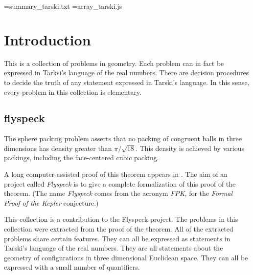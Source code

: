 






\newwrite\mywrite
\immediate\openout\mywrite=summary_tarski.txt
\newwrite\myhtml
\immediate\openout\myhtml=array_tarski.js

\def\filetarskiaway{
\immediate\write\mywrite{}\closeout\mywrite 
\immediate\write\myhtml{//fin}\closeout\myhtml
}


\section{Introduction}
\label{tarski:XX}


This is a collection of problems
in geometry.  Each problem can in fact be expressed in 
Tarksi's language of the real numbers.  There are decision
procedures to decide 
the truth of
any statement expressed in Tarski's language.  In this
sense, every problem in this collection is elementary.



\subsection{flyspeck}

The sphere packing problem asserts that no packing of congruent
balls in three dimensions has density greater than $\pi/\sqrt{18}$.
This density is achieved by various packings, including the
face-centered cubic packing.

A long computer-assisted proof of this theorem appears
in \cite{DCG}.  The aim of an project called {\it Flyspeck} is
to give a complete formalization of this proof of the theorem.
  (The name {\it Flyspeck} comes from the acronym {\it FPK},
for the {\it Formal Proof of the Kepler} conjecture.)

This collection is a contribution to the Flyspeck project.  The problems
in this collection were extracted from the proof of the theorem.   
All of the extracted problems share certain 
features.  They can all be expressed as statements in Tarski's
language of the real numbers.  They are all statements
about the geometry of configurations in three dimensional Euclidean
space.  They can all be expressed with a small number of quantifiers.

